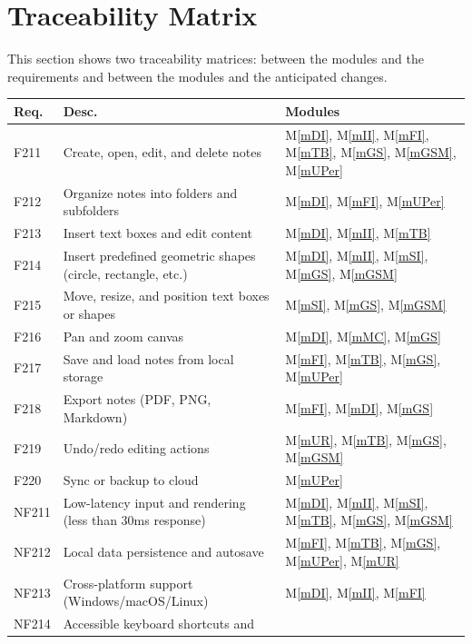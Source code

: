 \documentclass[12pt, titlepage]{article}
\newcommand{\mref}[1]{M\ref{#1}}
\begin{document}
\section{Traceability Matrix} \label{SecTM}

This section shows two traceability matrices: between the modules and the
requirements and between the modules and the anticipated changes.

\begin{table}[H]
\centering
\begin{tabular}{p{}p{} p{}}
\toprule
\textbf{Req.} &\textbf{Desc.}& \textbf{Modules}\\
\midrule
F211 & Create, open, edit, and
delete notes &\mref{mDI}, \mref{mII}, \mref{mFI}, \mref{mTB}, \mref{mGS}, \mref{mGSM}, \mref{mUPer}\\
F212 & Organize notes into
folders and subfolders
& \mref{mDI}, \mref{mFI}, \mref{mUPer}\\
F213 & Insert text boxes and edit
content& \mref{mDI}, \mref{mII}, \mref{mTB}\\
F214 & Insert predefined
geometric shapes (circle,
rectangle, etc.)&\mref{mDI}, \mref{mII}, \mref{mSI}, \mref{mGS}, \mref{mGSM}\\
F215 & Move, resize, and
position text boxes or
shapes & \mref{mSI}, \mref{mGS}, \mref{mGSM}\\
F216 & Pan and zoom canvas &\mref{mDI}, \mref{mMC}, \mref{mGS}\\
F217 & Save and load notes from
local storage & \mref{mFI}, \mref{mTB}, \mref{mGS}, \mref{mUPer}\\
F218 & Export notes (PDF, PNG,
Markdown) & \mref{mFI}, \mref{mDI}, \mref{mGS}\\
F219 & Undo/redo editing
actions
 &\mref{mUR}, \mref{mTB}, \mref{mGS}, \mref{mGSM}\\
F220 & Sync or backup
to cloud &\mref{mUPer}\\
NF211 & Low-latency input and
rendering (less than 30ms
response) &\mref{mDI}, \mref{mII}, \mref{mSI}, \mref{mTB}, \mref{mGS}, \mref{mGSM}\\
NF212 & Local data persistence
and autosave
 & \mref{mFI}, \mref{mTB}, \mref{mGS}, \mref{mUPer}, \mref{mUR}\\
NF213 & Cross-platform support
(Windows/macOS/Linux)
 & \mref{mDI}, \mref{mII}, \mref{mFI}\\
NF214 & Accessible keyboard
shortcuts and

\end{tabular}
\end{table}
\end{document}
